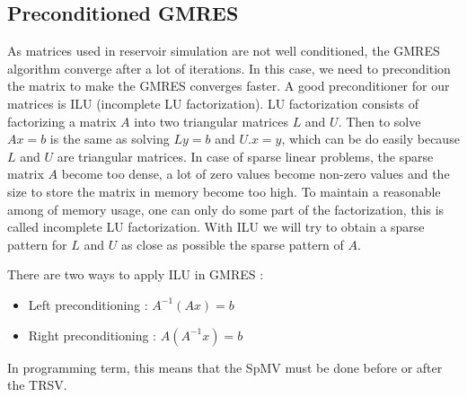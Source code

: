 \subsection{Preconditioned GMRES}
As matrices used in reservoir simulation are not well conditioned, the GMRES algorithm converge after a lot of iterations.
%
In this case, we need to precondition the matrix to make the GMRES converges faster.
%
A good preconditioner for our matrices is ILU (incomplete LU factorization).
%
LU factorization consists of factorizing a matrix $A$ into two triangular matrices $L$ and $U$.
%
Then to solve $Ax=b$ is the same as solving $Ly=b$ and $U.x=y$, which can be do easily because $L$ and $U$ are triangular matrices.
%
In case of sparse linear problems, the sparse matrix $A$ become too dense, a lot of zero values become non-zero values and the size to store the matrix in memory become too high.
%
To maintain a reasonable among of memory usage, one can only do some part of the factorization, this is called incomplete LU factorization.
%
With ILU we will try to obtain a sparse pattern for $L$ and $U$ as close as possible the sparse pattern of $A$.

There are two ways to apply ILU in GMRES :
\begin{itemize}
  \item Left preconditioning : $A^{-1}(Ax)=b$
  \item Right preconditioning : $A(A^{-1}x)=b$
\end{itemize}

In programming term, this means that the SpMV must be done before or after the TRSV.
